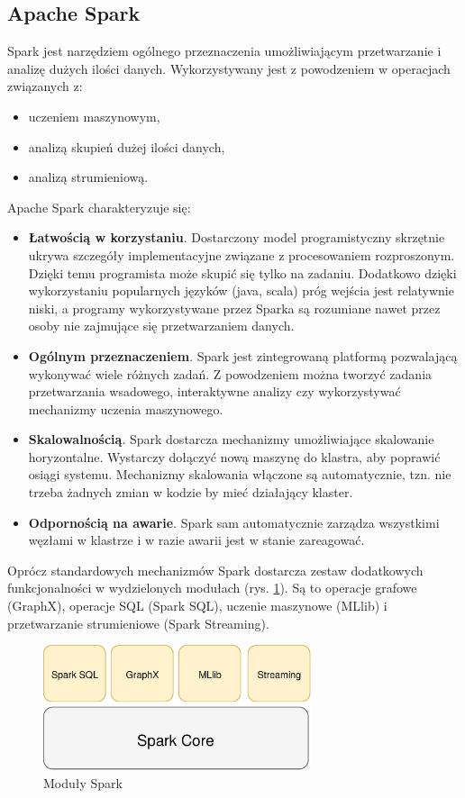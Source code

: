 \subsection{Apache Spark}
Spark jest narzędziem ogólnego przeznaczenia umożliwiającym przetwarzanie
i analizę dużych ilości danych.
Wykorzystywany jest z powodzeniem w operacjach związanych z:
\begin{itemize}
  \item uczeniem maszynowym,
  \item analizą skupień dużej ilości danych,
  \item analizą strumieniową.
\end{itemize}
Apache Spark charakteryzuje się:
\begin{itemize}
  \item \textbf{Łatwością w korzystaniu}.
  Dostarczony model programistyczny skrzętnie ukrywa szczegóły implementacyjne związane z procesowaniem rozproszonym.
  Dzięki temu programista może skupić się tylko na zadaniu.
  Dodatkowo dzięki wykorzystaniu popularnych języków (java, scala) próg wejścia jest relatywnie niski,
  a programy wykorzystywane przez Sparka są rozumiane nawet przez osoby nie zajmujące się przetwarzaniem danych.
  \item \textbf{Ogólnym przeznaczeniem}.
  Spark jest zintegrowaną platformą pozwalającą wykonywać wiele różnych zadań.
  Z powodzeniem można tworzyć zadania przetwarzania wsadowego,
  interaktywne analizy czy wykorzystywać mechanizmy uczenia maszynowego.
  \item \textbf{Skalowalnością}.
  Spark dostarcza mechanizmy umożliwiające skalowanie horyzontalne.
  Wystarczy dołączyć nową maszynę do klastra, aby poprawić osiągi systemu.
  Mechanizmy skalowania włączone są automatycznie,
  tzn. nie trzeba żadnych zmian w kodzie by mieć działający klaster.
  \item \textbf{Odpornością na awarie}.
  Spark sam automatycznie zarządza wszystkimi węzłami w klastrze
  i w razie awarii jest w stanie zareagować.
\end{itemize}

Oprócz standardowych mechanizmów Spark dostarcza zestaw dodatkowych funkcjonalności
w wydzielonych modułach (rys. \ref{fig:SparkModules}).
Są to operacje grafowe (GraphX), operacje SQL (Spark SQL), uczenie maszynowe (MLlib)
i przetwarzanie strumieniowe (Spark Streaming).
\begin{figure}[htbp]
  \centering
  \includegraphics[width=0.7\textwidth]{img/sparkModules}
  \caption{Moduły Spark}
  \label{fig:SparkModules}
\end{figure}
